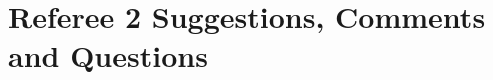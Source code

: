 \documentclass[11pt,english]{article}
\begin{document}
\newpage \setcounter{Ref}{2} \setcounter{RefComment}{0}
\section*{Referee 2 Suggestions, Comments and Questions }

\addtocounter{TotalComments}{\value{RefComment}}


 
 
\end{document}
